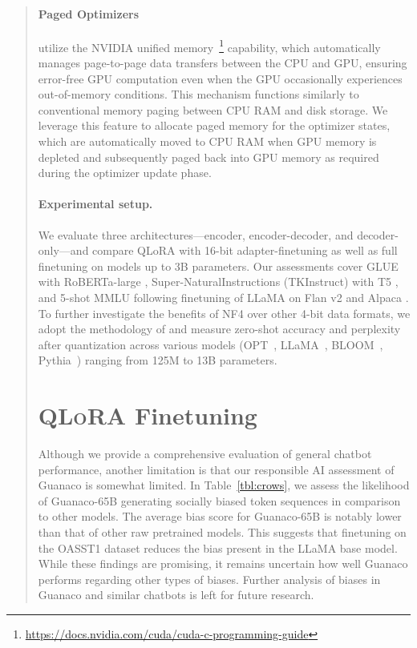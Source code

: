 \begin{quote}
\paragraph{Paged Optimizers} utilize the NVIDIA unified memory~\footnote{\tiny \url{https://docs.nvidia.com/cuda/cuda-c-programming-guide}} capability, which automatically manages page-to-page data transfers between the CPU and GPU, ensuring error-free GPU computation even when the GPU occasionally experiences out-of-memory conditions. This mechanism functions similarly to conventional memory paging between CPU RAM and disk storage. We leverage this feature to allocate paged memory for the optimizer states, which are automatically moved to CPU RAM when GPU memory is depleted and subsequently paged back into GPU memory as required during the optimizer update phase.

\paragraph{Experimental setup.} We evaluate three architectures—encoder, encoder-decoder, and decoder-only—and compare QLoRA with 16-bit adapter-finetuning as well as full finetuning on models up to 3B parameters. Our assessments cover GLUE \citep{wang2018glue} with RoBERTa-large \citep{liu2019roberta}, Super-NaturalInstructions (TKInstruct) \citep{wang2022super} with T5 \citep{t5}, and 5-shot MMLU \citep{hendrycksmeasuring} following finetuning of LLaMA on Flan v2 \citep{longpre2023flan} and Alpaca \citep{alpaca}. To further investigate the benefits of NF4 over other 4-bit data formats, we adopt the methodology of \citet{dettmers2022case} and measure zero-shot accuracy and perplexity after quantization across various models (OPT~\citep{zhang2022opt}, LLaMA~\citep{touvron2023llama}, BLOOM~\citep{scao2022bloom}, Pythia~\citep{biderman2023pythia}) ranging from 125M to 13B parameters.

\section{\textsc{QLoRA} Finetuning}

Although we provide a comprehensive evaluation of general chatbot performance, another limitation is that our responsible AI assessment of {Guanaco} is somewhat limited. In Table~\ref{tbl:crows}, we assess the likelihood of {Guanaco}-65B generating socially biased token sequences in comparison to other models. The average bias score for {Guanaco}-65B is notably lower than that of other raw pretrained models. This suggests that finetuning on the OASST1 dataset reduces the bias present in the LLaMA base model. While these findings are promising, it remains uncertain how well {Guanaco} performs regarding other types of biases. Further analysis of biases in {Guanaco} and similar chatbots is left for future research.


\end{quote}
